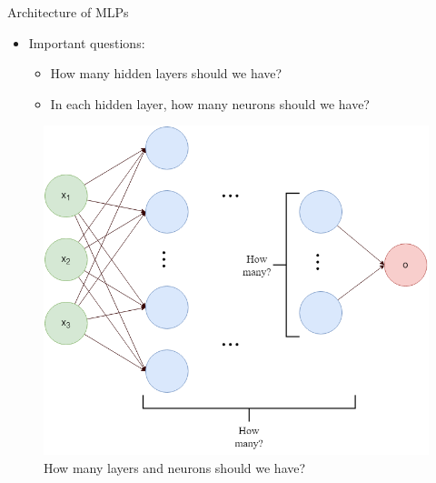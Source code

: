 \documentclass[compress,oilve,t]{beamer}
\begin{document}
\begin{frame}{Architecture of MLPs}
	\begin{itemize}
		\item Important questions:
		\begin{itemize}
			\item How many hidden layers should we have?
			\item In each hidden layer, how many neurons should we have?
		\end{itemize}
	\end{itemize}
	\begin{figure}[H]
		\centering
		\includegraphics[height=0.6\textheight]{Figs/how_many_layer.png}
		\caption{How many layers and neurons should we have?}
	\end{figure}
\end{frame}
\end{document}
